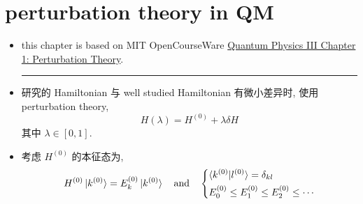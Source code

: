 \chapter{perturbation theory in QM}
\begin{itemize}
	\item this chapter is based on MIT OpenCourseWare \href{https://ocw.mit.edu/courses/8-06-quantum-physics-iii-spring-2018/resources/mit8_06s18ch1/}{Quantum Physics III Chapter 1: Perturbation Theory}.
	
	\noindent\rule[0.5ex]{\linewidth}{0.5pt} %
	
	\item 研究的 Hamiltonian 与 well studied Hamiltonian 有微小差异时, 使用 perturbation theory,
	\begin{equation}
		H(\lambda) = H^{(0)} + \lambda \delta H
	\end{equation}
	其中 $\lambda \in [0, 1]$.
	
	\item 考虑 $H^{(0)}$ 的本征态为,
	\begin{equation}
		H^{(0)} \ket{k^{(0)}} = E_k^{(0)} \ket{k^{(0)}} \quad \text{and} \quad \begin{dcases}
			\braket{k^{(0)} | l^{(0)}} = \delta_{k l} \\
			E_0^{(0)} \leq E_1^{(0)} \leq E_2^{(0)} \leq \cdots
		\end{dcases}
	\end{equation}
\end{itemize}

